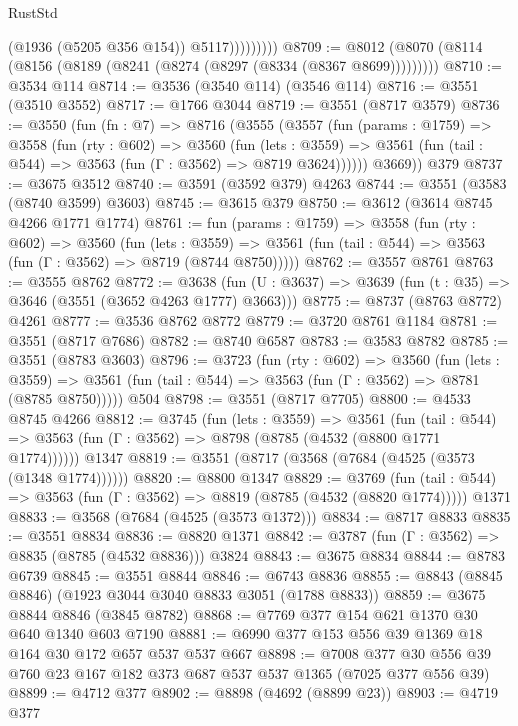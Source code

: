 \begin{lexlean}{RustStd}
\begin{coremodule}
                      (@1936 (@5205 @356 @154))
                      @5117)))))))))
@8709 := @8012 (@8070 (@8114 (@8156 (@8189 (@8241 (@8274 (@8297 (@8334 (@8367 @8699)))))))))
@8710 := @3534 @114
@8714 := @3536 (@3540 @114) (@3546 @114)
@8716 := @3551 (@3510 @3552)
@8717 := @1766 @3044
@8719 := @3551 (@8717 @3579)
@8736 := @3550
    (fun (fn : @7) =>
    @8716
      (@3555
        (@3557
          (fun (params : @1759) =>
          @3558
            (fun (rty : @602) =>
            @3560
              (fun (lets : @3559) =>
              @3561 (fun (tail : @544) => @3563 (fun (Γ : @3562) => @8719 @3624))))))
        @3669))
    @379
@8737 := @3675 @3512
@8740 := @3591 (@3592 @379) @4263
@8744 := @3551 (@3583 (@8740 @3599) @3603)
@8745 := @3615 @379
@8750 := @3612 (@3614 @8745 @4266 @1771 @1774)
@8761 := fun (params : @1759) =>
  @3558
    (fun (rty : @602) =>
    @3560
      (fun (lets : @3559) =>
      @3561 (fun (tail : @544) => @3563 (fun (Γ : @3562) => @8719 (@8744 @8750)))))
@8762 := @3557 @8761
@8763 := @3555 @8762
@8772 := @3638 (fun (U : @3637) => @3639 (fun (t : @35) => @3646 (@3551 (@3652 @4263 @1777) @3663)))
@8775 := @8737 (@8763 @8772) @4261
@8777 := @3536 @8762 @8772
@8779 := @3720 @8761 @1184
@8781 := @3551 (@8717 @7686)
@8782 := @8740 @6587
@8783 := @3583 @8782
@8785 := @3551 (@8783 @3603)
@8796 := @3723
    (fun (rty : @602) =>
    @3560
      (fun (lets : @3559) =>
      @3561 (fun (tail : @544) => @3563 (fun (Γ : @3562) => @8781 (@8785 @8750)))))
    @504
@8798 := @3551 (@8717 @7705)
@8800 := @4533 @8745 @4266
@8812 := @3745
    (fun (lets : @3559) =>
    @3561
      (fun (tail : @544) => @3563 (fun (Γ : @3562) => @8798 (@8785 (@4532 (@8800 @1771 @1774))))))
    @1347
@8819 := @3551 (@8717 (@3568 (@7684 (@4525 (@3573 (@1348 @1774))))))
@8820 := @8800 @1347
@8829 := @3769
    (fun (tail : @544) => @3563 (fun (Γ : @3562) => @8819 (@8785 (@4532 (@8820 @1774)))))
    @1371
@8833 := @3568 (@7684 (@4525 (@3573 @1372)))
@8834 := @8717 @8833
@8835 := @3551 @8834
@8836 := @8820 @1371
@8842 := @3787 (fun (Γ : @3562) => @8835 (@8785 (@4532 @8836))) @3824
@8843 := @3675 @8834
@8844 := @8783 @6739
@8845 := @3551 @8844
@8846 := @6743 @8836
@8855 := @8843 (@8845 @8846) (@1923 @3044 @3040 @8833 @3051 (@1788 @8833))
@8859 := @3675 @8844 @8846 (@3845 @8782)
@8868 := @7769 @377 @154 @621 @1370 @30 @640 @1340 @603 @7190
@8881 := @6990 @377 @153 @556 @39 @1369 @18 @164 @30 @172 @657 @537 @537 @667
@8898 := @7008 @377 @30 @556 @39 @760 @23 @167 @182 @373 @687 @537 @537 @1365 (@7025 @377 @556 @39)
@8899 := @4712 @377
@8902 := @8898 (@4692 (@8899 @23))
@8903 := @4719 @377

\end{coremodule}
\end{lexlean}
